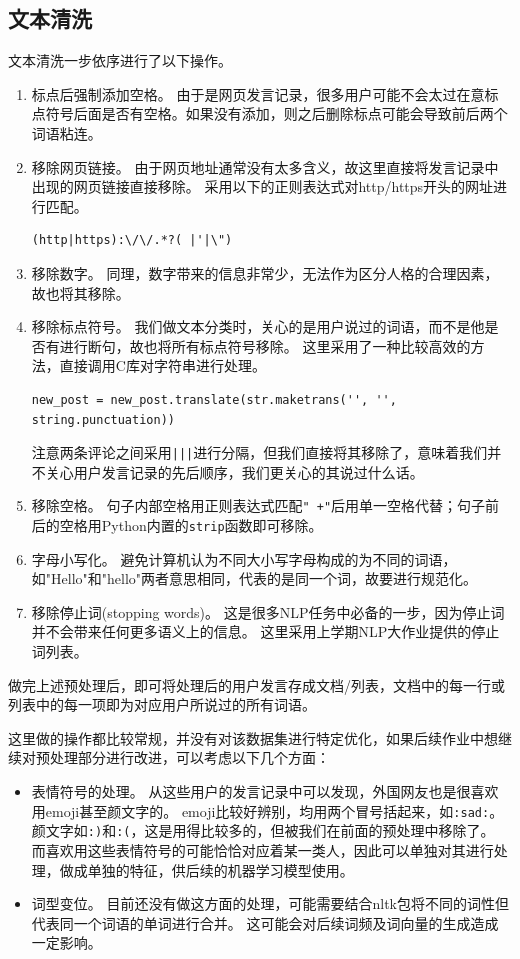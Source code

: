 \documentclass[logo,reportComp]{thesis}
\begin{document}
\subsection{文本清洗}
文本清洗一步依序进行了以下操作。
\begin{enumerate}
	\item 标点后强制添加空格。
	由于是网页发言记录，很多用户可能不会太过在意标点符号后面是否有空格。如果没有添加，则之后删除标点可能会导致前后两个词语粘连。
	\item 移除网页链接。
	由于网页地址通常没有太多含义，故这里直接将发言记录中出现的网页链接直接移除。
	采用以下的正则表达式对http/https开头的网址进行匹配。
\begin{lstlisting}
(http|https):\/\/.*?( |'|\")
\end{lstlisting}
	\item 移除数字。
	同理，数字带来的信息非常少，无法作为区分人格的合理因素，故也将其移除。
	\item 移除标点符号。
	我们做文本分类时，关心的是用户说过的词语，而不是他是否有进行断句，故也将所有标点符号移除。
	这里采用了一种比较高效的方法，直接调用C库对字符串进行处理。
\begin{lstlisting}
new_post = new_post.translate(str.maketrans('', '', string.punctuation))
\end{lstlisting}
	注意两条评论之间采用\verb'|||'进行分隔，但我们直接将其移除了，意味着我们并不关心用户发言记录的先后顺序，我们更关心的其说过什么话。
	\item 移除空格。
	句子内部空格用正则表达式匹配\verb'" +"'后用单一空格代替；句子前后的空格用Python内置的\verb'strip'函数即可移除。
	\item 字母小写化。
	避免计算机认为不同大小写字母构成的为不同的词语，如"Hello"和"hello"两者意思相同，代表的是同一个词，故要进行规范化。
	\item 移除停止词(stopping words)。
	这是很多NLP任务中必备的一步，因为停止词并不会带来任何更多语义上的信息。
	这里采用上学期NLP大作业提供的停止词列表\cite{bib:stopping_words}。
\end{enumerate}

做完上述预处理后，即可将处理后的用户发言存成文档/列表，文档中的每一行或列表中的每一项即为对应用户所说过的所有词语。

这里做的操作都比较常规，并没有对该数据集进行特定优化，如果后续作业中想继续对预处理部分进行改进，可以考虑以下几个方面：
\begin{itemize}
	\item 表情符号的处理。
	从这些用户的发言记录中可以发现，外国网友也是很喜欢用emoji甚至颜文字的。
	emoji比较好辨别，均用两个冒号括起来，如\verb':sad:'。
	颜文字如\verb':)'和\verb':('，这是用得比较多的，但被我们在前面的预处理中移除了。
	而喜欢用这些表情符号的可能恰恰对应着某一类人，因此可以单独对其进行处理，做成单独的特征，供后续的机器学习模型使用。
	\item 词型变位。
	目前还没有做这方面的处理，可能需要结合nltk包将不同的词性但代表同一个词语的单词进行合并。
	这可能会对后续词频及词向量的生成造成一定影响。
\end{itemize}
\end{document}
